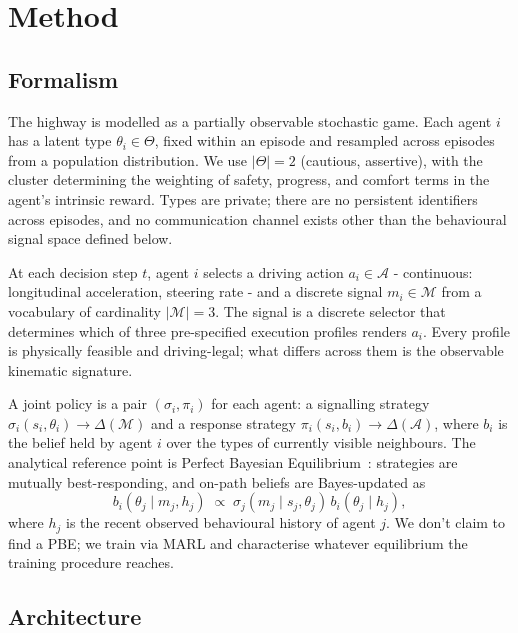 \documentclass[12pt,a4paper]{article}
\begin{document}
\section{Method}

\subsection{Formalism}

The highway is modelled as a partially observable stochastic game. Each agent $i$ has a latent
type $\theta_i \in \Theta$, fixed within an episode and resampled across episodes from a
population distribution. We use $|\Theta| = 2$ (cautious, assertive), with the cluster
determining the weighting of safety, progress, and comfort terms in the agent's intrinsic reward.
Types are private; there are no persistent identifiers across episodes, and no communication
channel exists other than the behavioural signal space defined below.

At each decision step $t$, agent $i$ selects a driving action $a_i \in \mathcal{A}$ -
continuous: longitudinal acceleration, steering rate - and a discrete signal $m_i \in \mathcal{M}$
from a vocabulary of cardinality $|\mathcal{M}| = 3$. The signal is a discrete selector that
determines which of three pre-specified execution profiles renders $a_i$. Every profile is
physically feasible and driving-legal; what differs across them is the observable kinematic
signature.

A joint policy is a pair $(\sigma_i, \pi_i)$ for each agent: a signalling strategy $\sigma_i(s_i,
\theta_i) \to \Delta(\mathcal{M})$ and a response strategy $\pi_i(s_i, b_i) \to \Delta(\mathcal{A})$,
where $b_i$ is the belief held by agent $i$ over the types of currently visible neighbours. The
analytical reference point is Perfect Bayesian Equilibrium~\cite{fudenberg1991game}: strategies
are mutually best-responding, and on-path beliefs are Bayes-updated as
\begin{equation}
    b_i(\theta_j \mid m_j, h_j) \;\propto\; \sigma_j(m_j \mid s_j, \theta_j)\,
    b_i(\theta_j \mid h_j),
    \label{eq:bayes}
\end{equation}
where $h_j$ is the recent observed behavioural history of agent $j$. We don't claim to find a
PBE; we train via MARL and characterise whatever equilibrium the training procedure reaches.

\subsection{Architecture}
\end{document}
